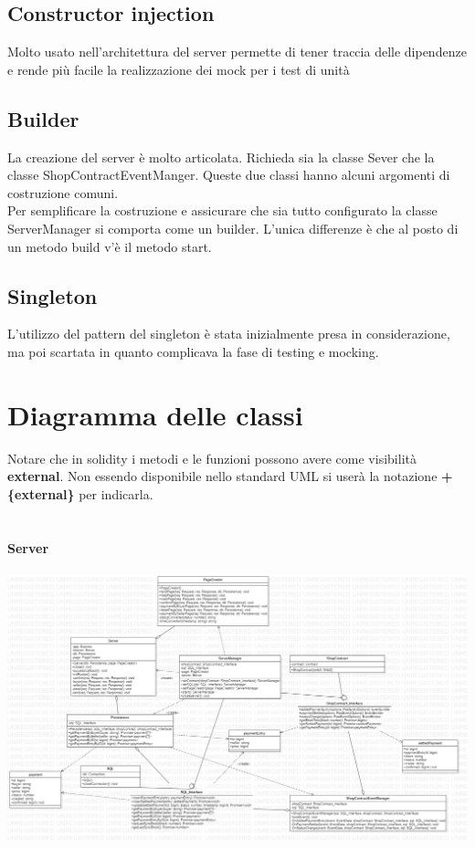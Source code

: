 \documentclass[a4paper, 12pt]{article}
\begin{document}
\subsection{Constructor injection}
Molto usato nell'architettura del server permette di tener traccia delle dipendenze e rende più facile la realizzazione dei mock per i test di unità
\subsection{Builder}
La creazione del server è molto articolata. Richieda sia la classe Sever che la classe ShopContractEventManger. Queste due classi hanno alcuni argomenti di
costruzione comuni.\\
Per semplificare la costruzione e assicurare che sia tutto configurato la classe ServerManager si comporta come un builder. L'unica differenze è che al posto
di un metodo build v'è il metodo start.
\subsection{Singleton}
L'utilizzo del pattern del singleton è stata inizialmente presa in considerazione, ma poi scartata in quanto complicava la fase di testing e mocking.
\section{Diagramma delle classi}
Notare che in solidity i metodi e le funzioni possono avere come visibilità \textbf{external}. Non essendo disponibile nello standard UML si userà la notazione \textbf{ +\{external\} } per indicarla.\\\\
\paragraph{Server}
\includegraphics[width=1.0\textwidth]{classes}
\end{document}

